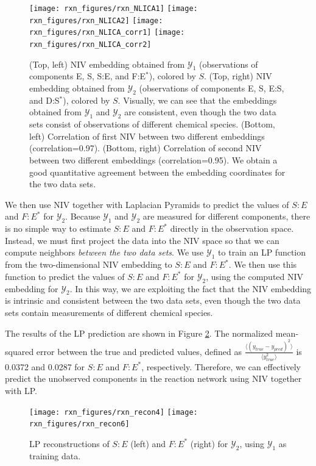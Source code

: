 \documentclass[aip,jcp,preprint]{revtex4-1}
\begin{document}
\begin{figure}[ht]
    \texttt{[image: rxn\_figures/rxn\_NLICA1]}
    \texttt{[image: rxn\_figures/rxn\_NLICA2]}
    \texttt{[image: rxn\_figures/rxn\_NLICA\_corr1]}
    \texttt{[image: rxn\_figures/rxn\_NLICA\_corr2]}
    \caption{(Top, left) NIV embedding obtained from $\mathcal{Y}_1$ (observations of components E, S, S:E, and F:E$^{*}$), colored by $S$. (Top, right) NIV embedding obtained from $\mathcal{Y}_2$ (observations of components E, S, E:S, and D:S$^{*}$), colored by $S$. Visually, we can see that the embeddings obtained from $\mathcal{Y}_1$ and $\mathcal{Y}_2$ are consistent, even though the two data sets consist of observations of different chemical species. (Bottom, left) Correlation of first NIV between two different embeddings (correlation=0.97). (Bottom, right)  Correlation of second NIV between two different embeddings (correlation=0.95). We obtain a good quantitative agreement between the embedding coordinates for the two data sets.}
    \label{fig:rxn_embedding}
\end{figure}

We then use NIV together with Laplacian Pyramids to predict the values of $S:E$ and $F:E^{*}$ for $\mathcal{Y}_2$.
%
Because $\mathcal{Y}_1$ and $\mathcal{Y}_2$ are measured for different components, there is no simple way to estimate $S:E$ and $F:E^{*}$ directly in the observation space.
%
Instead, we must first project the data into the NIV space so that we can compute neighbors {\em between the two data sets}.
%
We use $\mathcal{Y}_1$ to train an LP function from the two-dimensional NIV embedding to $S:E$ and $F:E^{*}$.
%
We then use this function to predict the values  of $S:E$ and $F:E^{*}$ for $\mathcal{Y}_2$, using the computed NIV embedding for $\mathcal{Y}_2$.
%
In this way, we are exploiting the fact that the NIV embedding is intrinsic and consistent between the two data sets, even though the two data sets contain measurements of different chemical species.

The results of the LP prediction are shown in Figure \ref{fig:rxn_recon}.
%
The normalized mean-squared error between the true and predicted values, defined as $\frac{\langle (y_{true}-y_{pred})^2 \rangle}{\langle y_{true}^2 \rangle}$ is 0.0372 and 0.0287 for $S:E$ and $F:E^{*}$, respectively.
%
Therefore, we can effectively predict the unobserved components in the reaction network using NIV together with LP.
%


\begin{figure}[ht]
    \texttt{[image: rxn\_figures/rxn\_recon4]}
    \texttt{[image: rxn\_figures/rxn\_recon6]}
    \caption{LP reconstructions of $S:E$ (left) and $F:E^{*}$ (right) for $\mathcal{Y}_2$, using $\mathcal{Y}_1$ as training data.}
    \label{fig:rxn_recon}
\end{figure}
\end{document}
